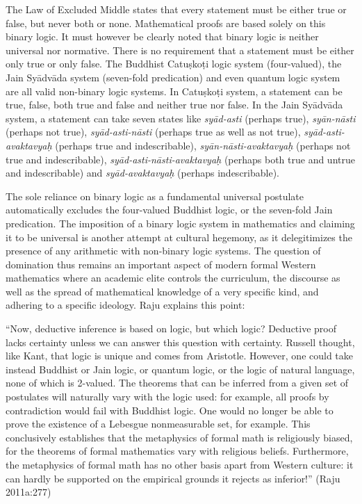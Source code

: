 The Law of Excluded Middle states that every statement must be either true or false, but never both or none. Mathematical proofs are based solely on this binary logic. It must however be clearly noted that binary logic is neither universal nor normative. There is no requirement that a statement must be either only true or only false. The Buddhist Catuṣkoṭi logic system (four-valued), the Jain Syādvāda system (seven-fold predication) and even quantum logic system are all valid non-binary logic systems. In Catuṣkoṭi system, a statement can be true, false, both true and false and neither true nor false. In the Jain Syādvāda system, a statement can take seven states like {\sl syād-asti} (perhaps true), {\sl syān-nāsti} (perhaps not true), {\sl syād-asti-nāsti} (perhaps true as well as not true), {\sl syād-asti-avaktavyaḥ} (perhaps true and indescribable), {\sl syān-nāsti-avaktavyaḥ} (perhaps not true and indescribable), {\sl syād-asti-nāsti-avaktavyaḥ} (perhaps both true and untrue and indescribable) and {\sl syād-avaktavyaḥ} (perhaps indescribable). 

The sole reliance on binary logic as a fundamental universal postulate automatically excludes the four-valued Buddhist logic, or the seven-fold Jain predication. The imposition of a binary logic system in mathematics and claiming it to be universal is another attempt at cultural hegemony, as it delegitimizes the presence of any arithmetic with non-binary logic systems. The question of domination thus remains an important aspect of modern formal Western mathematics where an academic elite controls the curriculum, the discourse as well as the spread of mathematical knowledge of a very specific kind, and adhering to a specific ideology. Raju explains this point: 
\begin{myquote}
``Now, deductive inference is based on logic, but which logic? Deductive proof lacks certainty unless we can answer this question with certainty. Russell thought, like Kant, that logic is unique and comes from Aristotle. However, one could take instead Buddhist or Jain logic, or quantum logic, or the logic of natural language, none of which is 2-valued. The theorems that can be inferred from a given set of postulates will naturally vary with the logic used: for example, all proofs by contradiction would fail with Buddhist logic. One would no longer be able to prove the existence of a Lebesgue nonmeasurable set, for example. This conclusively establishes that the metaphysics of formal math is religiously biased, for the theorems of formal mathematics vary with religious beliefs. Furthermore, the metaphysics of formal math has no other basis apart from Western culture: it can hardly be supported on the empirical grounds it rejects as inferior!''
\hfill (Raju 2011a:277)
\end{myquote}

